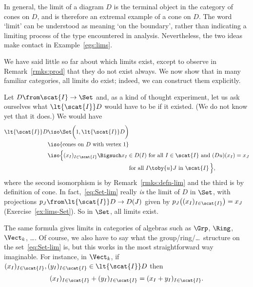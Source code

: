 In general, the limit of a diagram $D$ is the terminal object in the
category of cones on $D$, and is therefore an extremal example of a cone on
$D$.  The word `limit' can be understood as meaning `on the boundary',
rather than indicating a limiting process of the type encountered in
analysis.  Nevertheless, the two ideas make contact in
Example~\ref{egs:lims}.

We have said little so far about which limits exist, except to observe in
Remark~\ref{rmks:prod} that they do not exist
always.  We now show that in many familiar categories, all limits do exist;
indeed, we can construct them explicitly.

\begin{example} 
\label{eg:lims-Set}
Let $D\from \scat{I} \to \Set$ and, as a kind of thought%
%
%
experiment, let us ask ourselves what $\lt{\scat{I}} D$%
%
%
would have to be if it existed.  (We do not know yet that it does.)  We
would have
% 
\begin{align}
\lt{\scat{I}} D        &
\iso   \Set\biggl(1, \lt{\scat{I}} D\biggr)      
\nonumber       \\
                        &
\iso   
\{ \text{cones on } D \text{ with vertex } 1 \}             
\nonumber       \\
                        &\iso         
\Bigl\{ 
(x_I)_{I \in \scat{I}} 
\Bigsuch
x_I \in D(I) \text{ for all } I \in \scat{I} \text{ and }
(Du)(x_I) = x_J 
\nonumber \\
        &
\phantom{\iso \Bigl\{ (x_I)_{I \in \scat{I}} \Bigsuch {}}
\text{ for all } I \toby{u} J \text{ in }
\scat{I} 
\,\Bigr\},
\label{eq:Set-lim}
\end{align}
% 
where the second isomorphism is by
Remark~\ref{rmks:defn-lim} and the third is by
definition of cone.  In fact,~\eqref{eq:Set-lim} really \emph{is} the limit
of $D$ in $\Set$, with projections $p_J\from \lt{\scat{I}} D \to D(J)$
given by $p_J\bigl( (x_I)_{I \in \scat{I}} \bigr) = x_J$
(Exercise~\ref{ex:lims-Set}).  So in $\Set$, all limits exist.
\end{example}

\begin{example} 
\label{eg:lims-alg}
The same formula gives limits in categories of algebras such as $\Grp$,%
%
%
$\Ring$,%
%
%
$\Vect_k$,%
%
%
\ldots.  Of course, we also have to say what the
group/ring/\ldots\ structure on the set~\eqref{eq:Set-lim} is, but this
works in the most straightforward way imaginable.  For instance, in
$\Vect_k$, if $(x_I)_{I \in \scat{I}}, (y_I)_{I \in \scat{I}} \in
\lt{\scat{I}} D$ then
\[
(x_I)_{I \in \scat{I}} + (y_I)_{I \in \scat{I}}
=
(x_I + y_I)_{I \in \scat{I}}.
\]
\end{example}


